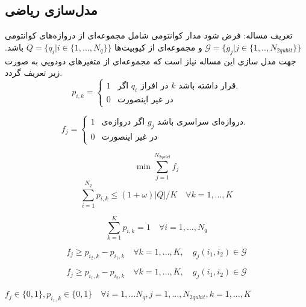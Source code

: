 \subsection{مدل‌سازی ریاضی }


تعریف مساله: فرض شود مدار کوانتومی شامل مجموعه‌ای از دروازه‌های کوانتومی $\mathcal{G}=\{g_{j}| j \in\{1,..,N_{2qubit}\}\}$  و مجموعه‌ای از کیوبیت‌ها
 $Q=\{q_{i}| i \in\{1,...,N_q\}\}$
 باشد. جهت مدل سازي اين مساله نياز است كه مجموعه‌اي از متغيرهاي دودويي به صورت زير تعريف گردد. 
\abovedisplayskip=3pt
\belowdisplayskip=0pt
\[
p_{i,k}=
\begin{cases}
 1& \text{اگر $q_i$ در افراز $k$ قرار داشته باشد.}\\
0& \text{در غیر اینصورت}
 \end{cases}
\]


\[
f_{j}=
\begin{cases}
 1& \text{اگر دروازه‌ی $g_j$ دروازه‌ای سراسری باشد. }\\
0& \text{در غیر اینصورت}
 \end{cases}
\]


\begin{equation}
\min \sum\limits_{j=1}^{N_{2qubit}} f_{j} 
\label{eq16}
\end{equation}
\begin{equation}
\sum\limits_{i=1}^{N_{q}} p_{i,k} \leq (1+\omega)|Q| /K \quad \forall k=1,...,K
\label{eq17}
\end{equation}

\begin{equation}
\sum\limits_{k=1}^K p_{i,k}=1    \quad \forall i=1,...,N_q
\label{eq18}
\end{equation}

\begin{equation}
f_{j}\geq p_{i_2,k}-p_{i_1,k} \quad \forall k=1,...,K, \quad g_j(i_{1},i_{2}) \in\mathcal{G}
\label{eq19}
\end{equation}

\begin{equation}
f_{j}\geq p_{i_1,k}-p_{i_2,k} \quad \forall k=1,...,K, \quad g_j(i_{1},i_{2}) \in\mathcal{G}
\label{eq20}
\end{equation}

 $f_{j} \in\{0,1\}, p_{i_1,k}\in\{0,1\} \quad \forall i=1,...N_{q}, j=1,...,N_{2qubit}, k=1,...,K$

